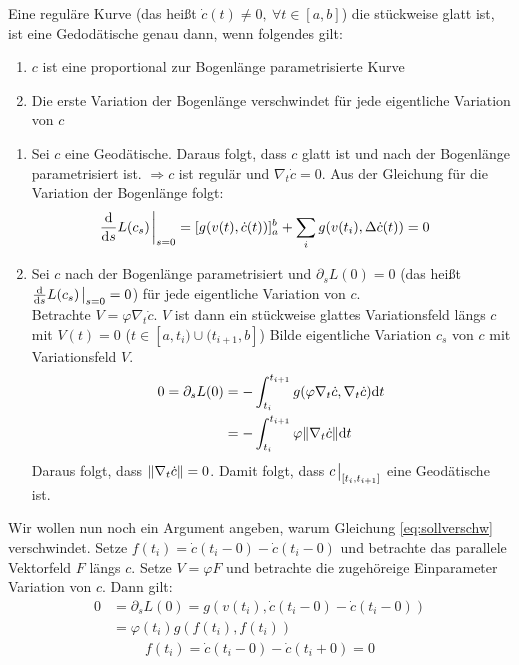 \begin{satz}
    Eine reguläre Kurve (das heißt $\dot{c}(t)\neq 0, \ \forall t \in [a, b]$) die stückweise glatt ist, ist eine Gedodätische genau dann, wenn folgendes gilt:
    \begin{enumerate}
    \item $c$ ist eine proportional zur Bogenlänge parametrisierte Kurve
    \item Die erste Variation der Bogenlänge verschwindet für jede eigentliche Variation von $c$
    \end{enumerate}
\end{satz}
\begin{bew}
    \begin{enumerate}
        \item Sei $c$ eine Geodätische.
            Daraus folgt, dass $c$ glatt ist und nach der Bogenlänge parametrisiert ist. 
            $\Rightarrow c$ ist regulär und $\nabla_t \dot{c} = 0$. 
            Aus der Gleichung für die Variation der Bogenlänge folgt:
            \begin{align*}
                &\dv{s}L(c_s)\eval_{s = 0} = [g(v(t), \dot{c}(t))]^b_a + \sum_i g(v(t_i), \Delta \dot{c}(t)) = 0
            \end{align*}
        \item Sei $c$ nach der Bogenlänge parametrisiert und $\partial_s L (0) = 0$ (das heißt $\dv{s}L(c_s)\eval_{s=0} = 0$) für jede eigentliche Variation von $c$.\\
            Betrachte $V = \varphi \nabla_t \dot{c}$.
            $V$ ist dann ein stückweise glattes Variationsfeld längs $c$ mit $V(t)=0$ ($t\in [a, t_i) \cup (t_{i + 1}, b]$)
            Bilde eigentliche Variation $c_s$ von $c$ mit Variationsfeld $V$.
            \begin{align}
                \label{eq:sollverschw}
                0 = \partial_s L(0) &= - \int^{t_{i + 1}}_{t_i} g(\varphi \nabla_t \dot{c}, \nabla_t \dot{c}) \dd t\\
                &= - \int^{t_{i+1}}_{t_i} \varphi \norm{\nabla_t \dot{c}} \dd t
            \end{align}
Daraus folgt, dass $\norm{\nabla_t \dot{c}} = 0$.
Damit folgt, dass $c\eval_{[t_i, t_{i+1} ]}$ eine Geodätische ist.
    \end{enumerate}
    Wir wollen nun noch ein Argument angeben, warum Gleichung \ref{eq:sollverschw} verschwindet.
    Setze $f(t_i) = \dot{c}(t_i - 0) - \dot{c}(t_i - 0)$ und betrachte das parallele Vektorfeld $F$ längs $c$.
    Setze $V = \varphi F $ und betrachte die zugehöreige Einparameter Variation von $c$.
    Dann gilt:
    \begin{align*}
        0 &= \partial_s L(0) = g(v(t_i), \dot{c}(t_i - 0) - \dot{c}(t_i - 0))\\
        &= \varphi(t_i) g(f(t_i), f(t_i))
    \end{align*}
\begin{align}
    f(t_i) = \dot{c}(t_i - 0) - \dot{c}(t_i + 0) = 0
\end{align}
\end{bew}
